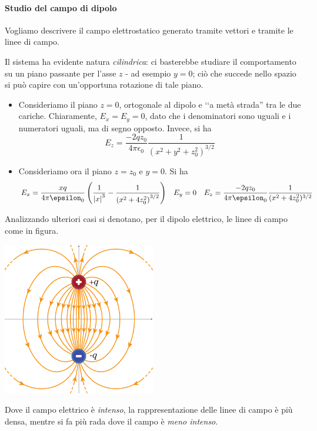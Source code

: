 \paragraph{Studio del campo di dipolo}
Vogliamo descrivere il campo elettrostatico generato tramite vettori e tramite le linee di campo.
\begin{observe}
	Il sistema ha evidente natura \textit{cilindrica}: ci basterebbe studiare il comportamento su un piano passante per l'asse $z$ - ad esempio $y=0$; ciò che succede nello spazio si può capire con un'opportuna rotazione di tale piano.
\end{observe}
\begin{itemize}
	\item Consideriamo il piano $z=0$, ortogonale al dipolo e ‘‘a metà strada'' tra le due cariche.
	Chiaramente, $E_x=E_y=0$, dato che i denominatori sono uguali e i numeratori uguali, ma di segno opposto. Invece, si ha
	\begin{equation*}
		E_z=\frac{-2qz_0}{4\pi\epsilon_0}\frac{1}{\left(x^2+y^2+z_0^2\right)^{3/2}}
	\end{equation*}
	\item Consideriamo ora il piano $z=z_0$ e $y=0$. Si ha
	\begin{align*}
		E_x=\frac{xq}{4\pi\epsilon_0}\left(\frac{1}{\abs{x}^3}-\frac{1}{\left(x^2+4z_0^2\right)^{3/2}}\right)&&
		E_y=0&&
		E_z=\frac{-2qz_0}{4\pi\epsilon_0}\frac{1}{(x^2+4z_0^2)^{3/2}}
	\end{align*}
\end{itemize}
Analizzando ulteriori casi si denotano, per il dipolo elettrico, le linee di campo come in figura.
\begin{center}
	\includegraphics[width=0.5\textwidth]{images/chp1/chp1campodipolo1.pdf}
\end{center}
\begin{observe}
	Dove il campo elettrico è \textit{intenso}, la rappresentazione delle linee di campo è più densa, mentre si fa più rada dove il campo è \textit{meno intenso}.
\end{observe}
